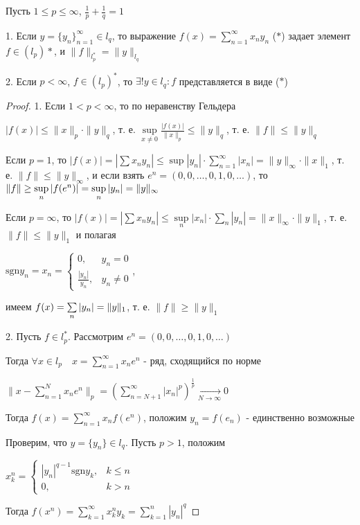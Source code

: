 \documentclass[a4paper,12pt]{report}
\newcommand*{\hm}[1]{#1\nobreak\discretionary{}%
            {\hbox{$\mathsurround=0pt #1$}}{}}
\begin{document}
\begin{thm}
Пусть $1\le p\le\infty$, $\frac1p+\frac1q=1$

1. Если $y=\{y_n\}_{n=1}^\infty\in l_q$, то выражение $f(x)=\sum\limits_{n=1}^\infty x_n y_n$ ($*$) задает элемент $f\in (l_p)*$, и $\|f\|_{l_p^*}=\|y\|_{l_q}$

2. Если $p<\infty$, $f\in(l_p)^*$, то $\exists! y\in l_q\colon f$ представляется в виде ($*$)
\end{thm}
\begin{proof}
1. Если $1<p<\infty$, то по неравенству Гельдера 

$|f(x)|\le\|x\|_p\cdot\|y\|_q$, т. е. $\sup\limits_{x\ne0}\displaystyle\frac{|f(x)|}{\|x\|_p}\le\|y\|_q$, т. е. $\|f\|\le\|y\|_q$

Если $p=1$, то $|f(x)|=|\sum x_n y_n|\le\sup|y_n|\cdot\sum\limits_{n=1}^\infty|x_n|=\|y\|_\infty\cdot\|x\|_1$, т. е. $\|f\|\le\|y\|_\infty$, и если взять $e^n=(0,0,\ldots,0,1,0,\ldots)$, то $\|f\|\ge\sup\limits_n|f(e^n)|\hm=\sup\limits_n|y_n|=\|y\|_\infty$

Если $p=\infty$, то $|f(x)|=|\sum x_n y_n|\le\sup\limits_n|x_n|\cdot\sum\limits_n|y_n|=\|x\|_\infty\cdot\|y\|_1$, т. е. $\|f\|\le\|y\|_1$ и полагая

 $\mathrm{sgn} y_n=x_n=\begin{cases} 0,& y_n=0\\\frac{|y_n|}{y_n},& y_n\ne0\end{cases}$, 

имеем $f(x)\hm=\sum\limits_n|y_n|=\|y\|_1$, т. е. $\|f\|\ge\|y\|_1$

2. Пусть $f\in l_p^*$. Рассмотрим $e^n=(0,0,\ldots,0,1,0,\ldots)$

Тогда $\forall x\in l_p\quad x=\sum\limits_{n=1}^\infty x_n e^n$ - ряд, сходящийся по норме 

$\|x-\sum\limits_{n=1}^N x_n e^n\|_p=\left(\sum\limits_{n=N+1}^\infty|x_n|^p\right)^{\frac1p}\xrightarrow[N\to\infty]{}0$

Тогда $f(x)=\sum\limits_{n=1}^\infty x_n f(e^n)$, положим $y_n=f(e_n)$ - единственно возможные 

Проверим, что $y=\{y_n\}\in l_q$. Пусть $p>1$, положим 

$x_k^n=\begin{cases}|y_n|^{q-1}\mathrm{sgn}y_k,&k\le n\\0,&k>n\end{cases}$

Тогда $f(x^n)=\sum\limits_{k=1}^\infty x_k^n y_k=\sum\limits_{k=1}^n|y_n|^q$


\end{proof}
\end{document}
